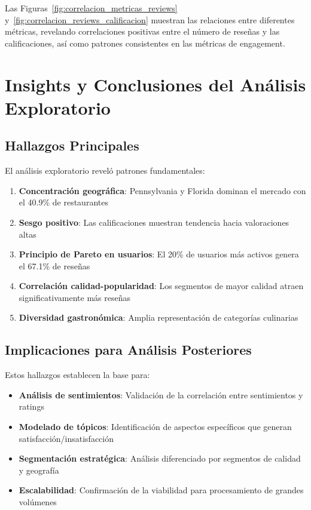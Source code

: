 \documentclass[12pt,a4paper,twoside,openany]{book}
\begin{document}
Las Figuras~\ref{fig:correlacion_metricas_reviews} y~\ref{fig:correlacion_reviews_calificacion} muestran las relaciones entre diferentes métricas, revelando correlaciones positivas entre el número de reseñas y las calificaciones, así como patrones consistentes en las métricas de engagement.

\section{Insights y Conclusiones del Análisis Exploratorio}

\subsection{Hallazgos Principales}

El análisis exploratorio reveló patrones fundamentales:

\begin{enumerate}
    \item \textbf{Concentración geográfica}: Pennsylvania y Florida dominan el mercado con el 40.9\% de restaurantes
    \item \textbf{Sesgo positivo}: Las calificaciones muestran tendencia hacia valoraciones altas
    \item \textbf{Principio de Pareto en usuarios}: El 20\% de usuarios más activos genera el 67.1\% de reseñas
    \item \textbf{Correlación calidad-popularidad}: Los segmentos de mayor calidad atraen significativamente más reseñas
    \item \textbf{Diversidad gastronómica}: Amplia representación de categorías culinarias
\end{enumerate}

\subsection{Implicaciones para Análisis Posteriores}

Estos hallazgos establecen la base para:
\begin{itemize}
    \item \textbf{Análisis de sentimientos}: Validación de la correlación entre sentimientos y ratings
    \item \textbf{Modelado de tópicos}: Identificación de aspectos específicos que generan satisfacción/insatisfacción
    \item \textbf{Segmentación estratégica}: Análisis diferenciado por segmentos de calidad y geografía
    \item \textbf{Escalabilidad}: Confirmación de la viabilidad para procesamiento de grandes volúmenes
\end{itemize}
\end{document}
